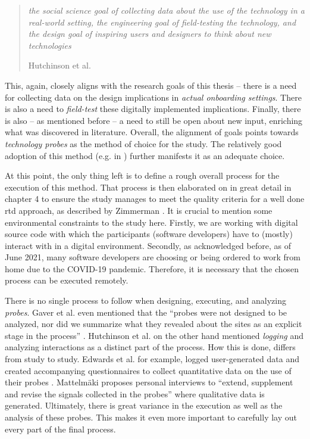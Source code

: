 \begin{quote}
  \textit{the social science goal of collecting data about the use of the technology in a real-world setting, the engineering goal of field-testing the technology, and the design goal of inspiring users and designers to think about new technologies}

  \footnotesize{Hutchinson et al. \cite[p. 17]{hutchinson2003technology}}
\end{quote}

This, again, closely aligns with the research goals of this thesis -- there is a need for collecting data on the design implications in \textit{actual onboarding settings}. There is also a need to \textit{field-test} these digitally implemented implications. Finally, there is also -- as mentioned before -- a need to still be open about new input, enriching what was discovered in literature. Overall, the alignment of goals points towards \textit{technology probes} as the method of choice for the study. The relatively good adoption of this method (e.g. in \cite{fitton2004probing,o2006holding,edwards2011exploring}) further manifests it as an adequate choice.

At this point, the only thing left is to define a rough overall process for the execution of this method. That process is then elaborated on in great detail in chapter 4 to ensure the study manages to meet the quality criteria for a well done \gls{rtd} approach, as described by Zimmerman \cite[p. 499]{zimmerman2007research}. It is crucial to mention some environmental constraints to the study here. Firstly, we are working with digital source code with which the participants (software developers) have to (mostly) interact with in a digital environment. Secondly, as acknowledged before, as of June 2021, many software developers are choosing or being ordered to work from home due to the COVID-19 pandemic. Therefore, it is necessary that the chosen process can be executed remotely.

There is no single process to follow when designing, executing, and analyzing \textit{probes}. Gaver et al. even mentioned that the \enquote{probes were not designed to be analyzed, nor did we summarize what they revealed about the sites as an explicit stage in the process} \cite[p. 27]{gaver1999design}. Hutchinson et al. on the other hand mentioned \textit{logging} and analyzing interactions as a distinct part of the process. How this is done, differs from study to study. Edwards et al. for example, logged user-generated data and created accompanying questionnaires to collect quantitative data on the use of their probes \cite[p. 107-110]{edwards2011exploring}. Mattelmäki proposes personal interviews to \enquote{extend, supplement and revise the signals collected in the probes} \cite[p. 86]{mattelmaki2006design} where qualitative data is generated. Ultimately, there is great variance in the execution as well as the analysis of these probes. This makes it even more important to carefully lay out every part of the final process.

